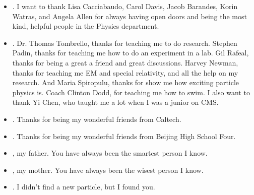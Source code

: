 \begin{itemize}
	\item {}. I want to thank Lisa Cacciabaudo, Carol Davis, Jacob Barandes, Korin Watras, and Angela Allen for always having open doors and being the most kind, helpful people in the Physics department.
	\item {}. Dr. Thomas Tombrello, thanks for teaching me to do research. Stephen Padin, thanks for teaching me how to do an experiment in a lab. Gil Rafeal, thanks for being a great a friend and great discussions. Harvey Newman, thanks for teaching me EM and special relativity, and all the help on my research. And Maria Spiropulu, thanks for show me how exciting particle physics is. Coach Clinton Dodd, for teaching me how to swim. I also want to thank Yi Chen, who taught me a lot when I was a junior on CMS.
	\item {}. Thanks for being my wonderful friends from Caltech.
	\item {}. Thanks for being my wonderful friends from Beijing High School Four.
	\item {}, my father. You have always been the smartest person I know.
	\item {}, my mother. You have always been the wisest person I know.
	\item {}. I didn't find a new particle, but I found you.
\end{itemize}



